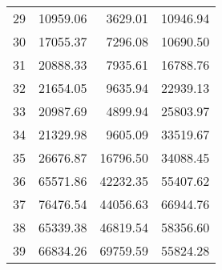 \begin{table}[ht]
\begin{tabular}{rrrr}
  29 & 10959.06 & 3629.01 & 10946.94 \\ 
  30 & 17055.37 & 7296.08 & 10690.50 \\ 
  31 & 20888.33 & 7935.61 & 16788.76 \\ 
  32 & 21654.05 & 9635.94 & 22939.13 \\ 
  33 & 20987.69 & 4899.94 & 25803.97 \\ 
  34 & 21329.98 & 9605.09 & 33519.67 \\ 
  35 & 26676.87 & 16796.50 & 34088.45 \\ 
  36 & 65571.86 & 42232.35 & 55407.62 \\ 
  37 & 76476.54 & 44056.63 & 66944.76 \\ 
  38 & 65339.38 & 46819.54 & 58356.60 \\ 
  39 & 66834.26 & 69759.59 & 55824.28 \\ 
   \hline
\end{tabular}
\end{table}
